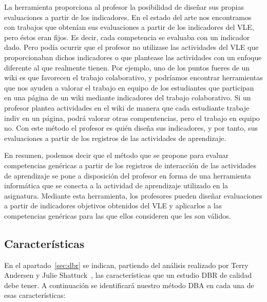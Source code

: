 La herramienta proporciona al profesor la posibilidad de diseñar sus propias evaluaciones a partir de los indicadores. En el estado del arte nos encontramos con trabajos que obtenían sus evaluaciones a partir de los indicadores del VLE, pero éstos eran fijos. Es decir, cada competencia se evaluaba con un indicador dado. Pero podía ocurrir que el profesor no utilizase las actividades del VLE que proporcionaban dichos indicadores o que plantease las actividades con un enfoque diferente al que realmente tienen. Por ejemplo, uno de los puntos fueres de un wiki es que favorecen el trabajo colaborativo, y podríamos encontrar herramientas que nos ayuden a valorar el trabajo en equipo de los estudiantes que participan en una página de un wiki mediante indicadores del trabajo colaborativo. Si un profesor plantea actividades en el wiki de manera que cada estudiante trabaje indiv en un página, podrá valorar otras compentencias, pero el trabajo en equipo no. Con este método el profesor es quién diseña sus indicadores, y por tanto, sus evaluaciones a partir de los registros de las actividades de aprendizaje.


En resumen, podemos decir que el método que se propone para evaluar competencias genéricas a partir de los registros de interacción de las actividades de aprendizaje se pone a disposición del profesor en forma de una herramienta informática que se conecta a la actividad de aprendizaje utilizado en la asignatura. Mediante esta herramienta, los profesores pueden diseñar evaluaciones a partir de indicadores objetivos obtenidos del VLE y aplicarlos a las competencias genéricas para las que ellos consideren que les son válidos.


\subsection{Características}

En el apartado~\ref{sec:dbr} se indican, partiendo del análisis realizado por Terry Andersen y Julie Shattuck~\cite{anderson2012design}, las características que un estudio DBR de calidad debe tener. A continuación se identificará nuestro método DBA en cada una de esas características:

